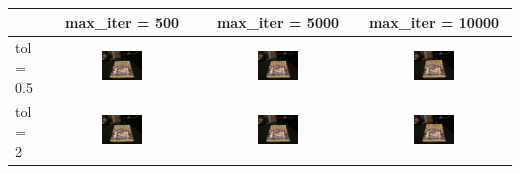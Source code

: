 \documentclass[
  course = {{16-720B Computer Vision}},
  quartile = {{1}},
  assignment = 4\ -\ Feature\ Descriptors\ \&\ Homographies\ \& \  RANSAC,
  name = {{Kangle Deng}},
  email = {{kangled@andrew.cmu.edu}},
  firstexercise = 1
]{aga-homework}
\begin{document}
\begin{table}
  \begin{center}
    \begin{tabular}{lccc}
      \toprule
       & max\_iter = 500 & max\_iter = 5000 & max\_iter = 10000 \\
      \midrule
tol = 0.5 & \includegraphics[width=0.28\textwidth]{CV/fig/hw4/6_2_00.jpg} & \includegraphics[width=0.28\textwidth]{CV/fig/hw4/6_2_01.jpg}
& \includegraphics[width=0.28\textwidth]{CV/fig/hw4/6_2_02.jpg}\\
tol = 2 & \includegraphics[width=0.28\textwidth]{CV/fig/hw4/6_2_10.jpg} & \includegraphics[width=0.28\textwidth]{CV/fig/hw4/6_2_11.jpg}
& \includegraphics[width=0.28\textwidth]{CV/fig/hw4/6_2_12.jpg}\\

\end{tabular}
\end{center}
\end{table}
\end{document}
